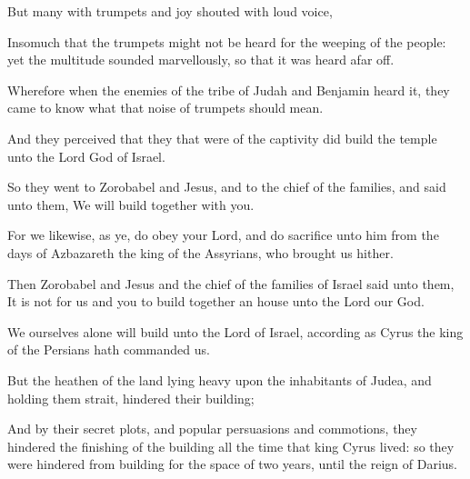 {\par }{\PP {}But many with trumpets and joy shouted with loud voice,
\par }{\PP {}Insomuch that the trumpets might not be heard for the weeping of the people: yet the multitude sounded marvellously, so that it was heard afar off.
\par }{\PP {}Wherefore when the enemies of the tribe of Judah and Benjamin heard it, they came to know what that noise of trumpets should mean.
\par }{\PP {}And they perceived that they that were of the captivity did build the temple unto the Lord God of Israel.
\par }{\PP {}So they went to Zorobabel and Jesus, and to the chief of the families, and said unto them, We will build together with you.
\par }{\PP {}For we likewise, as ye, do obey your Lord, and do sacrifice unto him from the days of Azbazareth the king of the Assyrians, who brought us hither.
\par }{\PP {}Then Zorobabel and Jesus and the chief of the families of Israel said unto them, It is not for us and you to build together an house unto the Lord our God.
\par }{\PP {}We ourselves alone will build unto the Lord of Israel, according as Cyrus the king of the Persians hath commanded us.
\par }{\PP {}But the heathen of the land lying heavy upon the inhabitants of Judea, and holding them strait, hindered their building;
\par }{\PP {}And by their secret plots, and popular persuasions and commotions, they hindered the finishing of the building all the time that king Cyrus lived: so they were hindered from building for the space of two years, until the reign of Darius.

}
